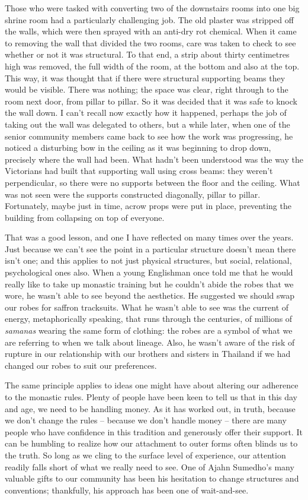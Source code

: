 Those who were tasked with converting two of the downstairs rooms into
one big shrine room had a particularly challenging job. The old plaster
was stripped off the walls, which were then sprayed with an anti-dry rot
chemical. When it came to removing the wall that divided the two rooms,
care was taken to check to see whether or not it was structural. To that
end, a strip about thirty centimetres high was removed, the full width
of the room, at the bottom and also at the top. This way, it was thought
that if there were structural supporting beams they would be visible.
There was nothing; the space was clear, right through to the room next
door, from pillar to pillar. So it was decided that it was safe to knock
the wall down. I can't recall now exactly how it happened, perhaps the
job of taking out the wall was delegated to others, but a while later,
when one of the senior community members came back to see how the work
was progressing, he noticed a disturbing bow in the ceiling as it was
beginning to drop down, precisely where the wall had been. What hadn't
been understood was the way the Victorians had built that supporting
wall using cross beams: they weren't perpendicular, so there were no
supports between the floor and the ceiling. What was not seen were the
supports constructed diagonally, pillar to pillar. Fortunately, maybe
just in time, acrow props were put in place, preventing the building
from collapsing on top of everyone.

That was a good lesson, and one I have reflected on many times over the
years. Just because we can't see the point in a particular structure
doesn't mean there isn't one; and this applies to not just physical
structures, but social, relational, psychological ones also. When a
young Englishman once told me that he would really like to take up
monastic training but he couldn't abide the robes that we wore, he
wasn't able to see beyond the aesthetics. He suggested we should swap
our robes for saffron tracksuits. What he wasn't able to see was the
current of energy, metaphorically speaking, that runs through the
centuries, of millions of \emph{samanas} wearing the same form of
clothing: the robes are a symbol of what we are referring to when we
talk about lineage. Also, he wasn't aware of the risk of rupture in our
relationship with our brothers and sisters in Thailand if we had changed
our robes to suit our preferences.

The same principle applies to ideas one might have about altering our
adherence to the monastic rules. Plenty of people have been keen to tell
us that in this day and age, we need to be handling money. As it has
worked out, in truth, because we don't change the rules -- because we
don't handle money -- there are many people who have confidence in this
tradition and generously offer their support. It can be humbling to
realize how our attachment to outer forms often blinds us to the truth.
So long as we cling to the surface level of experience, our attention
readily falls short of what we really need to see. One of Ajahn
Sumedho's many valuable gifts to our community has been his hesitation
to change structures and conventions; thankfully, his approach has been
one of wait-and-see.

